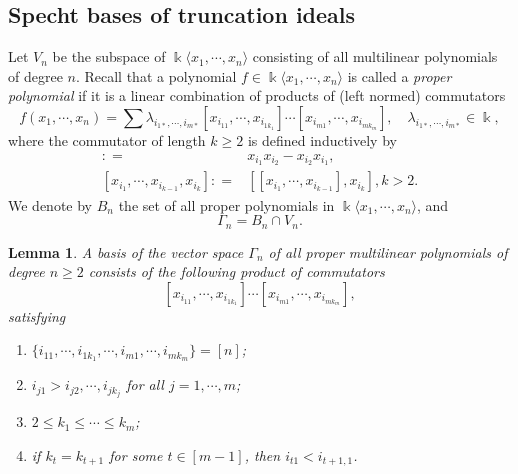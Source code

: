 \documentclass{amsart}
\newtheorem{lem}[thm]{Lemma}
\theoremstyle{definition}
\theoremstyle{remark}
\numberwithin{equation}{section}
\begin{document}
\subsection{Specht bases of truncation ideals}
\label{yysec3.1}
Let $V_n$ be the subspace of $\Bbbk\langle x_1, \cdots, 
x_n\rangle$ consisting of all multilinear polynomials of 
degree $n$. Recall that a polynomial $f\in \Bbbk \langle 
x_1, \cdots, x_n\rangle$ is called a 
\textit{proper polynomial} if it is a linear combination 
of products of (left normed) commutators
\[f(x_1, \cdots, x_n)
=\sum \lambda_{i_{1{\ast}}, \cdots, i_{m{\ast}}}
[x_{i_{11}}, \cdots, x_{i_{1k_1}}]\cdots
[x_{i_{m1}}, \cdots, x_{i_{mk_m}}], \quad 
\lambda_{i_{1{\ast}}, \cdots, i_{m{\ast}}}\in \Bbbk,\]
where the commutator of length $k\ge 2$ is defined inductively 
by 
\begin{align*}
[x_{i_1}, x_{i_2}]\colon= & x_{i_1}x_{i_2}-x_{i_2}x_{i_1}, \\
[x_{i_1}, \cdots, x_{i_{k-1}}, x_{i_k}]\colon=
& [[x_{i_1}, \cdots, x_{i_{k-1}}], x_{i_k}], k>2.
\end{align*}
We denote by $B_n$ the set of all proper polynomials in 
$\Bbbk \langle x_1, \cdots, x_n\rangle$, and
\[\Gamma_n=B_n\cap V_n.\]


\begin{lem}
\cite[Theorem 4.3.9]{Dr}
\label{yylem3.1}
A basis of the vector space $\Gamma_n$ of all proper 
multilinear polynomials of degree $n\ge 2$ consists of 
the following product of commutators
\[[x_{i_{11}}, \cdots, x_{i_{1k_1}}]\cdots
[x_{i_{m1}}, \cdots, x_{i_{mk_m}}],\]
satisfying
\begin{enumerate}
\item[(1)] 
$\{i_{11}, \cdots, i_{1k_1}, \cdots, i_{m1}, \cdots, 
i_{mk_m}\}=[n]$; 
\item[(2)] 
$i_{j1}>i_{j2}, \cdots, i_{jk_j}$ for all $j=1, \cdots, m$;
\item[(3)] 
$2\le k_1\le \cdots \le k_m$;
\item[(4)] 
if $k_t=k_{t+1}$ for some $t\in[m-1]$, then 
$i_{t1}<i_{t+1, 1}$.
\end{enumerate}
\end{lem}
\end{document}

